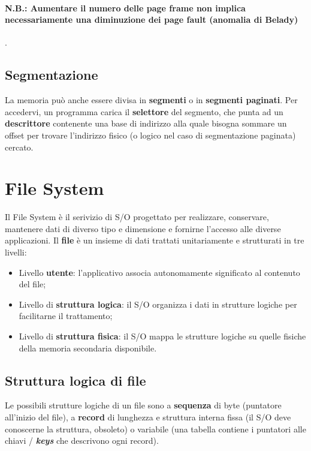 \documentclass{article}
\begin{document}
\paragraph{N.B.: Aumentare il numero delle page frame non implica necessariamente una diminuzione dei page fault (\textbf{anomalia di Belady})}.

\subsection{Segmentazione} La memoria può anche essere divisa in \textbf{segmenti} o in \textbf{segmenti paginati}. Per accedervi, un programma carica il \textbf{selettore} del segmento, che punta ad un \textbf{descrittore} contenente una base di indirizzo alla quale bisogna sommare un offset per trovare l'indirizzo fisico (o logico nel caso di segmentazione paginata) cercato.

\section{File System} Il File System è il serivizio di S/O progettato per realizzare, conservare, mantenere dati di diverso tipo e dimensione e fornirne l'accesso alle diverse applicazioni. Il \textbf{file} è un insieme di dati trattati unitariamente e strutturati in tre livelli:

\begin{itemize}
    \item Livello \textbf{utente}: l'applicativo associa autonomamente significato al contenuto del file;
    \item Livello di \textbf{struttura logica}: il S/O organizza i dati in strutture logiche per facilitarne il trattamento;
    \item Livello di \textbf{struttura fisica}: il S/O mappa le strutture logiche su quelle fisiche della memoria secondaria disponibile.
\end{itemize}

\subsection{Struttura logica di file} Le possibili strutture logiche di un file sono a \textbf{sequenza} di byte (puntatore all'inizio del file), a \textbf{record} di lunghezza e struttura interna fissa (il S/O deve conoscerne la struttura, obsoleto) o variabile (una tabella contiene i puntatori alle chiavi / \textit{\textbf{keys}} che descrivono ogni record).
\end{document}
